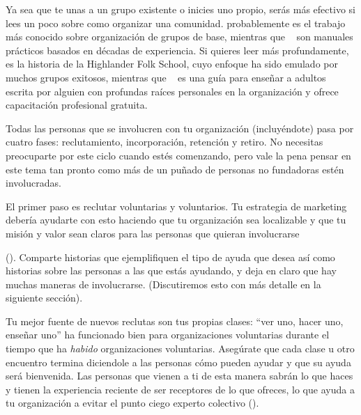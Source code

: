 Ya sea que te unas a un grupo existente o inicies uno propio,
serás más efectivo si lees un poco sobre como organizar una comunidad.
\cite{Alin1989,Lake2018} probablemente es el trabajo más conocido sobre organización de grupos de base,
mientras que ~\cite{Brow2007,Midw2010,Lake2018} son manuales prácticos basados en décadas de experiencia.
Si quieres leer más profundamente,
\cite{Adam1975} es la historia de la Highlander Folk School,
cuyo enfoque ha sido emulado por muchos grupos exitosos,
mientras que ~\cite{Spal2014} es una guía para enseñar a adultos
escrita por alguien con profundas raíces personales en la organización
y 
ofrece capacitación profesional gratuita.


Todas las personas que se involucren con tu organización
(incluyéndote)
pasa por cuatro fases:
reclutamiento, incorporación, retención y retiro.
No necesitas preocuparte por este ciclo cuando estés comenzando,
pero vale la pena pensar en este tema
tan pronto como más de un puñado de personas no fundadoras estén involucradas.

El primer paso es reclutar voluntarias y voluntarios.
Tu estrategia de marketing debería ayudarte con esto haciendo que tu organización sea localizable
y que tu misión y valor sean claros
para las personas que quieran involucrarse

().
Comparte historias que ejemplifiquen el tipo de ayuda que desea
así como historias sobre las personas a las que estás ayudando,
y deja en claro que hay muchas maneras de involucrarse.
(Discutiremos esto con más detalle en la siguiente sección).

Tu mejor fuente de nuevos reclutas son tus propias clases:
``ver uno, hacer uno, enseñar uno'' ha funcionado bien para organizaciones voluntarias
durante el tiempo que ha \emph{habido} organizaciones voluntarias.
Asegúrate que cada clase u otro encuentro
termina diciendole a las personas cómo pueden ayudar y que su ayuda será bienvenida.
Las personas que vienen a ti de esta manera sabrán lo que haces
y tienen la experiencia reciente de ser receptores de lo que ofreces,
lo que ayuda a tu organización a evitar el punto ciego experto colectivo ().

